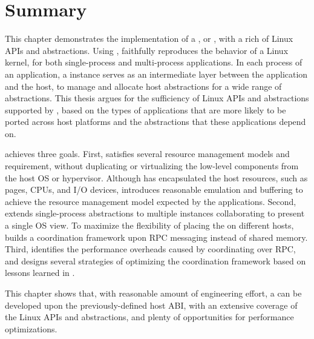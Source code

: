 \section{Summary}

This chapter demonstrates the implementation of a \libos{}, or \thelibos{}, with a rich of Linux APIs and abstractions.
Using \thehostabi{},
\thelibos{} faithfully reproduces the behavior of a Linux kernel,
for both single-process and multi-process applications.
In each process of an application,
a \thelibos{} instance serves as an intermediate layer
between the application and the host,
to manage and allocate host abstractions for a wide range of \libos{} abstractions.
This thesis argues for the sufficiency of Linux APIs and abstractions
supported by \thelibos{},
based on the types of applications that are more likely to be ported across host platforms and the abstractions that these applications depend on.


\thelibos{} achieves three goals.
First, \thelibos{} satisfies
several resource management models and requirement, without duplicating or virtualizing the low-level components from the host OS or hypervisor.
Although \thehostabi{} has encapsulated the host resources,
such as pages, CPUs, and I/O devices,
\thelibos{} introduces reasonable emulation and buffering to achieve the resource management model expected by the applications.
Second, \thelibos{} extends single-process abstractions
to multiple \thelibos{} instances collaborating to present a single OS view.
To maximize the flexibility of placing the \picoprocs{}
on different hosts,
\thelibos{} builds a coordination framework upon RPC messaging instead of shared memory.
Third, \thelibos{} identifies the performance overheads
caused by coordinating over RPC, 
and designs several strategies of optimizing the coordination framework
based on lessons learned in \graphene{}.


This chapter shows that, with reasonable amount of engineering effort,
a \libos{} can be developed upon the previously-defined host ABI, with an extensive coverage of the Linux APIs and abstractions, and plenty of opportunities for performance optimizations.
